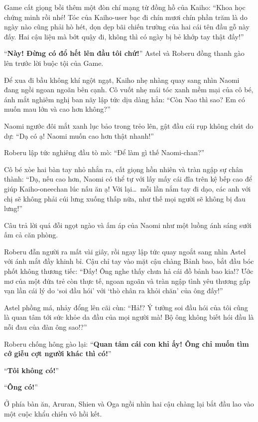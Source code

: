 \documentclass[../main.tex]{subfiles}
\begin{document}
Game cất giọng bồi thêm một đòn chí mạng từ đồng hồ của Kaiho: ``Khoa học chứng minh rồi nhé! Tóc của Kaiho-user bạc đi chín mươi chín phần trăm là do ngày nào cũng phải hò hét, dọn dẹp bãi chiến trường của hai cái tên đầu gỗ này đấy. Hai cậu liệu mà bớt quậy đi, không thì có ngày bị bẻ khớp tay thật đấy!''

``\textbf{Này! Đừng có đổ hết lên đầu tôi chứ!}'' Astel và Roberu đồng thanh gào lên trước lời buộc tội của Game.

Để xua đi bầu không khí ngột ngạt, Kaiho nhẹ nhàng quay sang nhìn Naomi đang ngồi ngoan ngoãn bên cạnh. Cô vuốt nhẹ mái tóc xanh mềm mại của cô bé, ánh mắt nghiêm nghị ban nãy lập tức dịu dàng hẳn: ``Còn Nao thì sao? Em có muốn mau lớn và cao hơn không?''

Naomi ngước đôi mắt xanh lục bảo trong trẻo lên, gật đầu cái rụp không chút do dự: ``Dạ có ạ! Naomi muốn cao hơn thật nhanh!''

Roberu lập tức nghiêng đầu tò mò: ``Để làm gì thế Naomi-chan?''

Cô bé xòe hai bàn tay nhỏ nhắn ra, cất giọng hồn nhiên và tràn ngập sự chân thành: ``Dạ, nếu cao hơn, Naomi có thể tự với lấy mấy cái đĩa trên kệ bếp cao để giúp Kaiho-oneechan lúc nấu ăn ạ! Với lại\dots\ mỗi lần nắm tay đi dạo, các anh với chị sẽ không phải cúi lưng xuống thấp nữa, như thế mọi người sẽ không bị đau lưng!''

Câu trả lời quá đỗi ngọt ngào và ấm áp của Naomi như một luồng ánh sáng sưởi ấm cả căn phòng.

Roberu đẫn người ra mất vài giây, rồi ngay lập tức quay ngoắt sang nhìn Astel với ánh mắt đầy khinh bỉ. Cậu chỉ tay vào mặt cậu chàng Bảnh bao, bắt đầu bóc phốt không thương tiếc: ``Đấy! Ông nghe thấy chưa hả cái đồ bảnh bao kia!? Ước mơ của một đứa trẻ còn thực tế, ngoan ngoãn và tràn ngập tình yêu thương gấp vạn lần cái lý do `soi đầu hói' với `thò chân ra khỏi chăn' của ông đấy!''

Astel phồng má, nhảy đổng lên cãi cùn: ``Hả!? Ý tưởng soi đầu hói của tôi cũng là quan tâm tới sức khỏe da đầu của mọi người mà! Bộ ông không biết hói đầu là nỗi đau của đàn ông sao!?''

Roberu chống hông gào lại: ``\textbf{Quan tâm cái con khỉ ấy! Ông chỉ muốn tìm cớ giễu cợt người khác thì có!}''

``\textbf{Tôi không có!}''

``\textbf{Ông có!}''

Ở phía bàn ăn, Aruran, Shien và Oga ngồi nhìn hai cậu chàng lại bắt đầu lao vào một cuộc khẩu chiến vô hồi kết.
\end{document}
